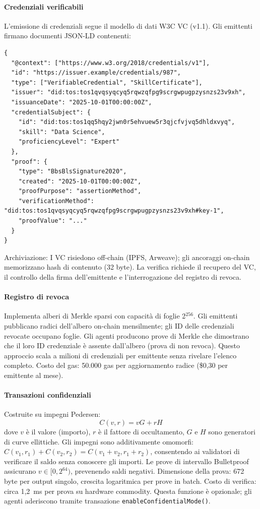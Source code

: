 \documentclass[11pt]{article}
\begin{document}
\paragraph{Credenziali verificabili} L'emissione di credenziali segue il modello di dati W3C VC (v1.1). Gli emittenti firmano documenti JSON-LD contenenti:
\begin{verbatim}
{
  "@context": ["https://www.w3.org/2018/credentials/v1"],
  "id": "https://issuer.example/credentials/987",
  "type": ["VerifiableCredential", "SkillCertificate"],
  "issuer": "did:tos:tos1qvqsyqcyq5rqwzqfpg9scrgwpugpzysnzs23v9xh",
  "issuanceDate": "2025-10-01T00:00:00Z",
  "credentialSubject": {
    "id": "did:tos:tos1qq5hqy2jwn0r5ehvuew5r3qjcfvjvq5dhldxvyq",
    "skill": "Data Science",
    "proficiencyLevel": "Expert"
  },
  "proof": {
    "type": "BbsBlsSignature2020",
    "created": "2025-10-01T00:00:00Z",
    "proofPurpose": "assertionMethod",
    "verificationMethod": "did:tos:tos1qvqsyqcyq5rqwzqfpg9scrgwpugpzysnzs23v9xh#key-1",
    "proofValue": "..."
  }
}
\end{verbatim}
Archiviazione: I VC risiedono off-chain (IPFS, Arweave); gli ancoraggi on-chain memorizzano hash di contenuto (32 byte). La verifica richiede il recupero del VC, il controllo della firma dell'emittente e l'interrogazione del registro di revoca.

\paragraph{Registro di revoca} Implementa alberi di Merkle sparsi con capacità di foglie 2$^{256}$. Gli emittenti pubblicano radici dell'albero on-chain mensilmente; gli ID delle credenziali revocate occupano foglie. Gli agenti producono prove di Merkle che dimostrano che il loro ID credenziale è assente dall'albero (prova di non revoca). Questo approccio scala a milioni di credenziali per emittente senza rivelare l'elenco completo. Costo del gas: 50.000 gas per aggiornamento radice (\$0,30 per emittente al mese).

\paragraph{Transazioni confidenziali} Costruite su impegni Pedersen:
\begin{equation}
C(v, r) = vG + rH
\end{equation}
dove $v$ è il valore (importo), $r$ è il fattore di occultamento, $G$ e $H$ sono generatori di curve ellittiche. Gli impegni sono additivamente omomorfi: $C(v_1, r_1) + C(v_2, r_2) = C(v_1 + v_2, r_1 + r_2)$, consentendo ai validatori di verificare il saldo senza conoscere gli importi. Le prove di intervallo Bulletproof assicurano $v \in [0, 2^{64})$, prevenendo saldi negativi. Dimensione della prova: 672 byte per output singolo, crescita logaritmica per prove in batch. Costo di verifica: circa 1,2~ms per prova su hardware commodity. Questa funzione è opzionale; gli agenti aderiscono tramite transazione \texttt{enableConfidentialMode()}.
\end{document}
